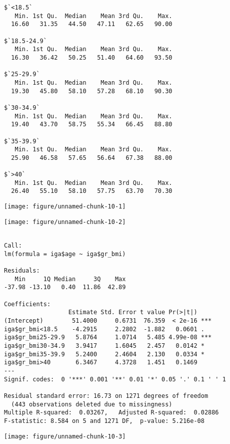 \documentclass[11pt,a4paper]{article}\usepackage[]{graphicx}\usepackage[]{color}
\makeatletter
\def\maxwidth{ %
  \ifdim\Gin@nat@width>\linewidth
    \linewidth
  \else
    \Gin@nat@width
  \fi
}
\newenvironment{kframe}{%
 \def\at@end@of@kframe{}%
 \ifinner\ifhmode%
  \def\at@end@of@kframe{\end{minipage}}%
  \begin{minipage}{\columnwidth}%
 \fi\fi%
 \def\FrameCommand##1{\hskip\@totalleftmargin \hskip-\fboxsep
 \colorbox{shadecolor}{##1}\hskip-\fboxsep
     \hskip-\linewidth \hskip-\@totalleftmargin \hskip\columnwidth}%
 \MakeFramed {\advance\hsize-\width
   \@totalleftmargin\z@ \linewidth\hsize
   \@setminipage}}%
 {\par\unskip\endMakeFramed%
 \at@end@of@kframe}
\newenvironment{knitrout}{}{} %
\makeatother
\begin{document}
\begin{knitrout}
\color{fgcolor}\begin{kframe}
\begin{verbatim}
$`<18.5`
   Min. 1st Qu.  Median    Mean 3rd Qu.    Max. 
  16.60   31.35   44.50   47.11   62.65   90.00 

$`18.5-24.9`
   Min. 1st Qu.  Median    Mean 3rd Qu.    Max. 
  16.30   36.42   50.25   51.40   64.60   93.50 

$`25-29.9`
   Min. 1st Qu.  Median    Mean 3rd Qu.    Max. 
  19.30   45.80   58.10   57.28   68.10   90.30 

$`30-34.9`
   Min. 1st Qu.  Median    Mean 3rd Qu.    Max. 
  19.40   43.70   58.75   55.34   66.45   88.80 

$`35-39.9`
   Min. 1st Qu.  Median    Mean 3rd Qu.    Max. 
  25.90   46.58   57.65   56.64   67.38   88.00 

$`>40`
   Min. 1st Qu.  Median    Mean 3rd Qu.    Max. 
  26.40   55.10   58.10   57.75   63.70   70.30 
\end{verbatim}
\end{kframe}
\texttt{[image: figure/unnamed-chunk-10-1]} 

\texttt{[image: figure/unnamed-chunk-10-2]} 
\begin{kframe}\begin{verbatim}

Call:
lm(formula = iga$age ~ iga$gr_bmi)

Residuals:
   Min     1Q Median     3Q    Max 
-37.98 -13.10   0.40  11.86  42.89 

Coefficients:
                  Estimate Std. Error t value Pr(>|t|)    
(Intercept)        51.4000     0.6731  76.359  < 2e-16 ***
iga$gr_bmi<18.5    -4.2915     2.2802  -1.882   0.0601 .  
iga$gr_bmi25-29.9   5.8764     1.0714   5.485 4.99e-08 ***
iga$gr_bmi30-34.9   3.9417     1.6045   2.457   0.0142 *  
iga$gr_bmi35-39.9   5.2400     2.4604   2.130   0.0334 *  
iga$gr_bmi>40       6.3467     4.3728   1.451   0.1469    
---
Signif. codes:  0 '***' 0.001 '**' 0.01 '*' 0.05 '.' 0.1 ' ' 1

Residual standard error: 16.73 on 1271 degrees of freedom
  (443 observations deleted due to missingness)
Multiple R-squared:  0.03267,	Adjusted R-squared:  0.02886 
F-statistic: 8.584 on 5 and 1271 DF,  p-value: 5.216e-08
\end{verbatim}
\end{kframe}
\texttt{[image: figure/unnamed-chunk-10-3]} 


\end{knitrout}
\end{document}
